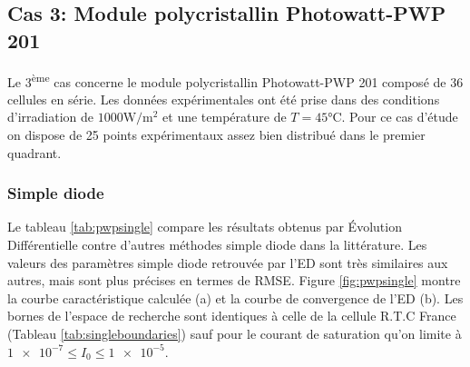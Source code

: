 \subsection{Cas 3: Module polycristallin Photowatt-PWP 201}

Le 3\textsuperscript{ème} cas concerne le module polycristallin Photowatt-PWP 201 composé de 36 cellules en série. Les données expérimentales ont été prise dans des conditions d'irradiation de $1000 \si{\watt\per\square\meter}$ et une température de $T = 45 \si{\celsius}$. Pour ce cas d'étude on dispose de 25 points expérimentaux assez bien distribué dans le premier quadrant.

\subsubsection{Simple diode}
Le tableau \ref{tab:pwpsingle} compare les résultats obtenus par Évolution Différentielle contre d'autres méthodes simple diode dans la littérature. Les valeurs des paramètres simple diode retrouvée par l'ED sont très similaires aux autres, mais sont plus précises en termes de RMSE. Figure \ref{fig:pwpsingle} montre la courbe caractéristique calculée (a) et la courbe de convergence de l'ED (b). Les bornes de l'espace de recherche sont identiques à celle de la cellule R.T.C France (Tableau \ref{tab:singleboundaries}) sauf pour le courant de saturation qu'on limite à $\num{1e-7} \leq I_{0} \leq \num{1e-5}$.

